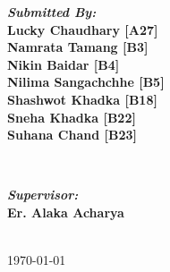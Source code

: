 \documentclass{article}
\begin{document}
\begin{titlepage}
\begin{center}
    \begin{minipage}{0.4\textwidth}
      \begin{flushleft}
        \textbf{\Large \textit{ Submitted By: } \\[0.3cm]
        Lucky Chaudhary [A27]   \\
        Namrata Tamang [B3]     \\
        Nikin Baidar [B4]       \\
        Nilima Sangachchhe [B5] \\
        Shashwot Khadka [B18]   \\
        Sneha Khadka [B22]      \\[2.2mm]
        Suhana Chand [B23]
        } \\ [1cm]
      \end{flushleft}
    \end{minipage}
    ~
    \begin{minipage}{0.4\textwidth}
      \begin{flushright}
        \vspace{-135pt}
        \textbf{\Large \textit{Supervisor:} \\[0.3cm]
        Er. Alaka Acharya \\
        }
      \end{flushright}
    \end{minipage}\\[2cm]

    \vfill
    \enlargethispage{\baselineskip}
    { \Large \today}

  \end{center}

\end{titlepage}
\end{document}
